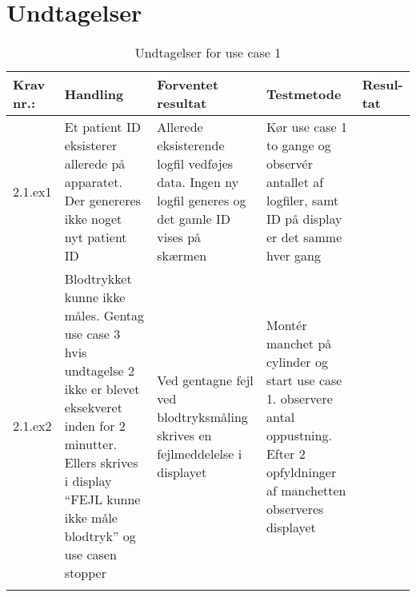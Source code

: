 		\section*{Undtagelser}
			\begin{longtable}{|p{}|p{0.23\textwidth}|p{}|p{}|p{}|}
				\hline
									\rowcolor{usDef}
				Krav nr.: & Handling & Forventet resultat & Testmetode & Resul-tat  \\\hline
				2.1.ex1 & Et patient ID eksisterer allerede på apparatet. Der genereres ikke noget nyt patient ID & Allerede eksisterende logfil vedføjes data. Ingen ny logfil generes og det gamle ID vises på skærmen & Kør use case 1 to gange og observér antallet af logfiler, samt ID på display er det samme hver gang &  \\
				\hline
				2.1.ex2 & Blodtrykket kunne ikke måles. Gentag use case 3 hvis undtagelse 2 ikke er blevet eksekveret inden for 2 minutter. Ellers skrives i display “FEJL kunne ikke måle blodtryk” og use casen stopper  & Ved gentagne fejl ved blodtryksmåling skrives en fejlmeddelelse i displayet & Montér manchet på cylinder og start use case 1. observere antal oppustning. Efter 2 opfyldninger af manchetten observeres displayet & \\ \hline
				\caption{Undtagelser for use case 1}
			\end{longtable}